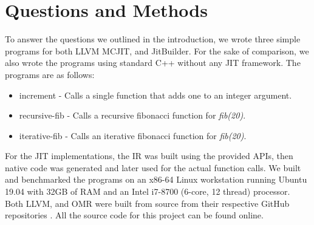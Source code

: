 \section{Questions and Methods}
\label{sec:methodology}
To answer the questions we outlined in the introduction, we wrote three simple programs for both LLVM MCJIT, and JitBuilder.
For the sake of comparison, we also wrote the programs using standard C++ without any JIT framework.
The programs are as follows:
\begin{itemize}
    \item increment - Calls a single function that adds one to an integer argument.
    \item recursive-fib - Calls a recursive fibonacci function for \textit{fib(20)}.
    \item iterative-fib - Calls an iterative fibonacci function for \textit{fib(20)}.  
\end{itemize}
For the JIT implementations, the IR was built using the provided APIs, then native code was generated and later used for the actual function calls.
We built and benchmarked the programs on an x86-64 Linux workstation running Ubuntu 19.04 with 32GB of RAM and an Intel i7-8700 (6-core, 12 thread) processor. 
Both LLVM, and OMR were built from source from their respective GitHub repositories \cite{llvmCommit, omrCommit}.
All the source code for this project can be found online\cite{projectGithub}.